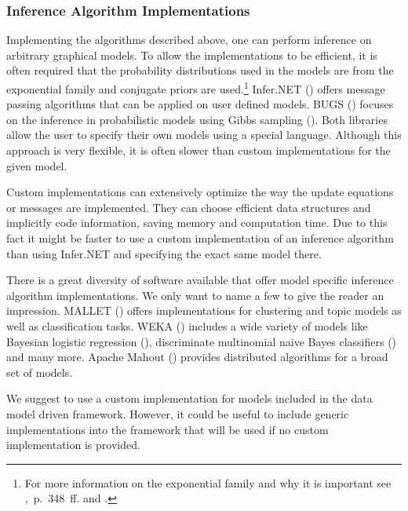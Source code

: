 \subsubsection{Inference Algorithm Implementations}
\label{subsec:custom-inference}

Implementing the algorithms described above, one can perform inference on arbitrary graphical models. To allow the implementations to be efficient, it is often required that the probability distributions used in the models are from the exponential family and conjugate priors are used.\footnote{For more information on the exponential family and why it is important see \textcite{murphy2012machine},~p.~348~ff. and \textcite{andersen1970sufficiency}.} Infer.NET (\cite{InferNET12}) offers message passing algorithms that can be applied on user defined models. BUGS (\cite{lunn2009bugs}) focuses on the inference in probabilistic models using Gibbs sampling (\cite{geman1984stochastic}). Both libraries allow the user to specify their own models using a special language. Although this approach is very flexible, it is often slower than custom implementations for the given model.

Custom implementations can extensively optimize the way the update equations or messages are implemented. They can choose efficient data structures and implicitly code information, saving memory and computation time. Due to this fact it might be faster to use a custom implementation of an inference algorithm than using Infer.NET and specifying the exact same model there.

There is a great diversity of software available that offer model specific inference algorithm implementations. We only want to name a few to give the reader an impression. MALLET (\cite{mccallum2002mallet}) offers implementations for clustering and topic models as well as classification tasks. WEKA (\cite{hall2009weka}) includes a wide variety of models like Bayesian logistic regression (\cite{genkin2007large}), discriminate multinomial naive Bayes classifiers (\cite{talia2005weka4ws}) and many more. Apache Mahout (\cite{mahout}) provides distributed algorithms for a broad set of models.

We suggest to use a custom implementation for models included in the data model driven framework. However, it could be useful to include generic implementations into the framework that will be used if no custom implementation is provided.
